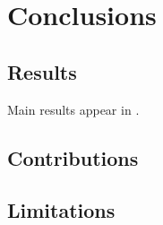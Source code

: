


\chapter{Conclusions}
\label{ch5:hurn}



\section{Results}
\label{ch4:Introduction}

Main results appear in \cite{DeFreitas_2004_Diagnosis}.

\section{Contributions}
\label{ch4:Maquina}



\section{Limitations}
\label{ch5:Instruments}



\newpage
